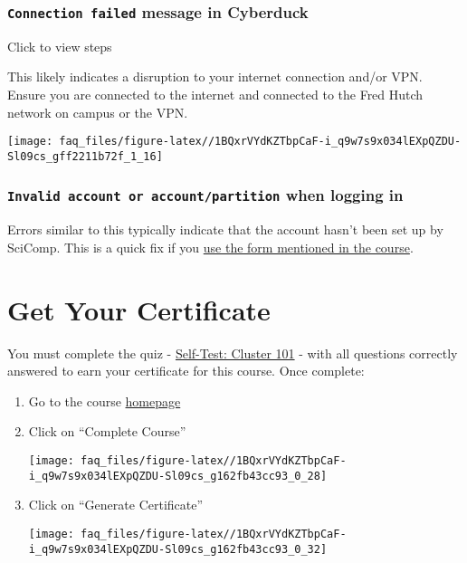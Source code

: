 \documentclass[
]{book}
\begin{document}
\hypertarget{connection-failed-message-in-cyberduck}{%
\subsection*{\texorpdfstring{\texttt{Connection\ failed} message in Cyberduck}{Connection failed message in Cyberduck}}\label{connection-failed-message-in-cyberduck}}

Click to view steps

This likely indicates a disruption to your internet connection and/or VPN. Ensure you are connected to the internet and connected to the Fred Hutch network on campus or the VPN.

\texttt{[image: faq\_files/figure-latex//1BQxrVYdKZTbpCaF-i\_q9w7s9x034lEXpQZDU-Sl09cs\_gff2211b72f\_1\_16]}

\hypertarget{invalid-account-or-accountpartition-when-logging-in}{%
\subsection*{\texorpdfstring{\texttt{Invalid\ account\ or\ account/partition} when logging in}{Invalid account or account/partition when logging in}}\label{invalid-account-or-accountpartition-when-logging-in}}

Errors similar to this typically indicate that the account hasn't been set up by SciComp. This is a quick fix if you \href{account-setup.html\#pi-account}{use the form mentioned in the course}.

\hypertarget{get-your-certificate}{%
\chapter*{Get Your Certificate}\label{get-your-certificate}}

You must complete the quiz - \href{https://leanpub.com/courses/fredhutch/fredhutchcluster101/quizzes/self_test_101}{Self-Test: Cluster 101} -
with all questions correctly answered to earn your certificate for this course. Once complete:

\begin{enumerate}
\def\labelenumi{\arabic{enumi}.}
\item
  Go to the course \href{https://leanpub.com/courses/fredhutch/fredhutchcluster101/home}{homepage}\\
\item
  Click on ``Complete Course''

  \texttt{[image: faq\_files/figure-latex//1BQxrVYdKZTbpCaF-i\_q9w7s9x034lEXpQZDU-Sl09cs\_g162fb43cc93\_0\_28]}
\item
  Click on ``Generate Certificate''

  \texttt{[image: faq\_files/figure-latex//1BQxrVYdKZTbpCaF-i\_q9w7s9x034lEXpQZDU-Sl09cs\_g162fb43cc93\_0\_32]}
\end{enumerate}
\end{document}
